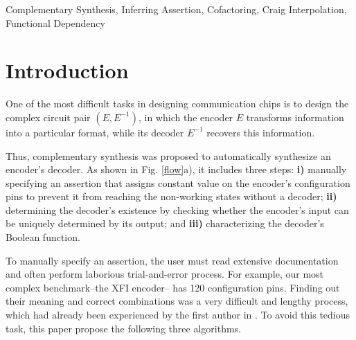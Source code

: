 \documentclass[journal]{IEEEtran}
\begin{document}
\begin{IEEEkeywords}
Complementary Synthesis, Inferring Assertion, Cofactoring, Craig Interpolation, Functional Dependency
\end{IEEEkeywords}






%
\IEEEpeerreviewmaketitle


\newtheorem{definition11}{\textbf{Definition}}
\newtheorem{lemma}{\textbf{Lemma}}
\newtheorem{theorem}{\textbf{Theorem}}
\newtheorem{proposition}{\textbf{Proposition}}

\section{Introduction}\label{sec_intro}

One of the most difficult tasks in designing communication chips
is to design the complex circuit pair $(E,E^{-1})$,
in which the encoder $E$ transforms information into a particular format,
while its decoder $E^{-1}$ recovers this information.

Thus,
complementary synthesis \cite{ShengYuShen:iccad09} was proposed
to automatically synthesize an encoder's decoder.
As shown in Fig. \ref{flow}a),
it includes three steps:
\textbf{i)} manually specifying an assertion that assigns constant value on the encoder's configuration pins
to prevent it from reaching the non-working states without a decoder;
\textbf{ii)}
determining the decoder's existence by checking whether the encoder's input can be uniquely determined by its output;
and
\textbf{iii)}
characterizing the decoder's Boolean function.

To manually specify an assertion,
the user must read extensive documentation
and often perform laborious trial-and-error process.
For example,
our most complex benchmark--the XFI encoder--
has 120 configuration pins.
Finding out their meaning and correct combinations was a very difficult and lengthy process,
which had already been experienced by the first author in \cite{ShengYuShen:iccad09}.
To avoid this tedious task,
this paper propose the following three algorithms.
\end{document}
